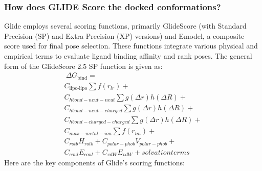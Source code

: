 \documentclass[11pt]{article}
\begin{document}
\subsubsection*{How does GLIDE Score the docked conformations?}
Glide employs several scoring functions, primarily GlideScore (with Standard Precision (SP) and Extra Precision (XP) versions) and Emodel, a composite score used for final pose selection. These functions integrate various physical and empirical terms to evaluate ligand binding affinity and rank poses.
The general form of the GlideScore 2.5 SP function is given as:
\begin{equation} \label{eq:GLIDEscore}
\begin{split}
\ \Delta G_{\text{bind}} = \\ C_{\text{lipo-lipo}}{\sum}f(r_{lr}) + \\ 
                    C_{hbond-neut-neut}{\sum}g({\Delta}r) h({\Delta}R) + \\
                    C_{hbond-neut-charged}{\sum}g({\Delta}r) h({\Delta}R) + \\ 
                    C_{hbond-charged-charged}{\sum}g({\Delta}r) h({\Delta}R) + \\
                    C_{max-metal-ion}{\sum}f(r_{lm}) +  \\
                    C_{rotb}H_{rotb} + C_{polar-phob}V_{polar-phob} +  \\
                    C_{coul}E_{coul} + C_{vdW}E_{vdW} + solvation terms 
\end{split}
\end{equation}
Here are the key components of Glide's scoring functions:
\end{document}
